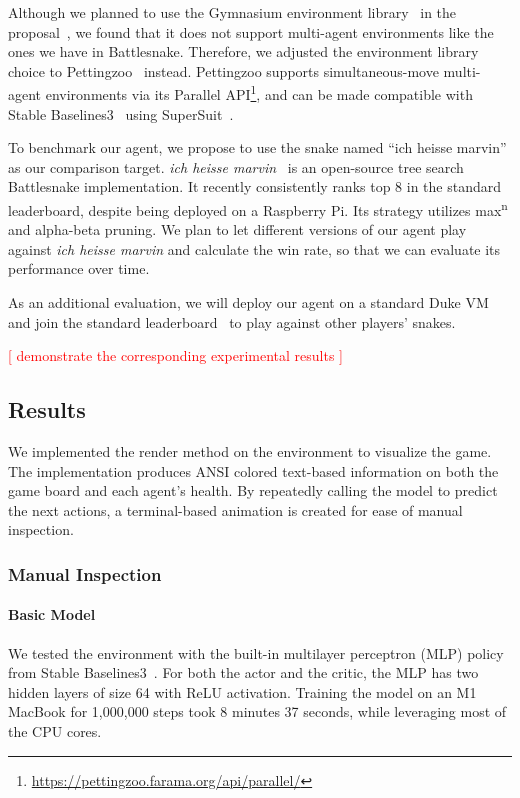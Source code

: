 \documentclass[conference]{IEEEtran}
\newcommand{\todo}[1]{\textcolor{red}{[ #1 ]}}
\begin{document}
Although we planned to use the Gymnasium environment
library~\cite{farama2024gymnasium} in the proposal~\cite{proposal},
we found that it does not support multi-agent environments like the ones we have
in Battlesnake. Therefore,
we adjusted the environment library choice to
Pettingzoo~\cite{terry2021pettingzoo} instead.
Pettingzoo supports simultaneous-move multi-agent environments via its Parallel
API\footnote{\url{https://pettingzoo.farama.org/api/parallel/}},
and can be made compatible with Stable Baselines3~\cite{raffin2024stable}
using SuperSuit~\cite{SuperSuit}.

To benchmark our agent,
we propose to use the snake named ``ich heisse marvin'' as our comparison
target. \emph{ich heisse marvin}~\cite{wrenger2024rusty}
is an open-source tree search Battlesnake implementation.
It recently consistently ranks top 8 in the standard leaderboard,
despite being deployed on a Raspberry Pi. Its strategy utilizes
max\textsuperscript{n} and alpha-beta pruning.
We plan to let different versions of our agent play against \emph{ich heisse
    marvin} and calculate the win rate,
so that we can evaluate its performance over time.

As an additional evaluation,
we will deploy our agent on a standard Duke VM and join the standard
leaderboard~\cite{standard_leaderboard} to play against other players' snakes.

\todo{demonstrate the corresponding experimental results}

\subsection{Results}

We implemented the \textsf{render}
method on the environment to visualize the game.
The implementation produces ANSI colored text-based information on both the game
board and each agent's health.
By repeatedly calling the model to predict the next actions,
a terminal-based animation is created for ease of manual inspection.

\subsubsection{Manual Inspection}

\paragraph{Basic Model}

We tested the environment with the built-in multilayer perceptron (MLP)
policy from Stable Baselines3~\cite{raffin2024stable}.
For both the actor and the critic,
the MLP has two hidden layers of size 64 with ReLU activation.
Training the model on an M1 MacBook for 1,000,000 steps took 8 minutes 37
seconds, while leveraging most of the CPU cores.
\end{document}
